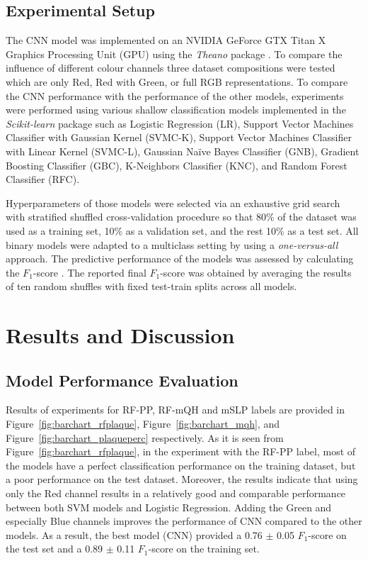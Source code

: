 \documentclass[runningheads,a4paper]{llncs}
\begin{document}
\subsection{Experimental Setup}
The CNN model was implemented on an NVIDIA GeForce GTX Titan X Graphics Processing Unit (GPU) using the \emph{Theano} package \cite{bergstra2011theano}. To compare the influence of different colour channels three dataset compositions were tested which are only Red, Red with Green, or full RGB representations. To compare the CNN performance with the performance of the other models, experiments were performed using various shallow classification models implemented in the \emph{Scikit-learn} package \cite{scikit-learn} such as Logistic Regression (LR), Support Vector Machines Classifier with Gaussian Kernel (SVMC-K), Support Vector Machines Classifier with Linear Kernel (SVMC-L), Gaussian Naïve Bayes Classifier (GNB), Gradient Boosting Classifier (GBC), K-Neighbors Classifier (KNC), and Random Forest Classifier (RFC).

Hyperparameters of those models were selected via an exhaustive grid search with stratified shuffled cross-validation procedure so that 80\% of the dataset was used as a training set, 10\% as a validation set, and the rest 10\% as a test set. All binary models were adapted to a multiclass setting by using a \emph{one-versus-all} approach. The predictive performance of the models was assessed by calculating the $F_1$-score \cite{sokolova2009systematic}. The reported final $F_1$-score was obtained by averaging the results of ten random shuffles with fixed test-train splits across all models.

\section{Results and Discussion}
\subsection{Model Performance Evaluation}
Results of experiments for RF-PP, RF-mQH and mSLP labels are provided in Figure~\ref{fig:barchart_rfplaque}, Figure~\ref{fig:barchart_mqh}, and Figure~\ref{fig:barchart_plaqueperc} respectively. As it is seen from Figure~\ref{fig:barchart_rfplaque}, in the experiment with the RF-PP label, most of the models have a perfect classification performance on the training dataset, but a poor performance on the test dataset. Moreover, the results indicate that using only the Red channel results in a relatively good and comparable performance between both SVM models and Logistic Regression. Adding the Green and especially Blue channels improves the performance of CNN compared to the other models. As a result, the best model (CNN) provided a 0.76 $\pm$ 0.05 $F_1$-score on the test set and a 0.89 $\pm$ 0.11 $F_1$-score on the training set.
\end{document}
